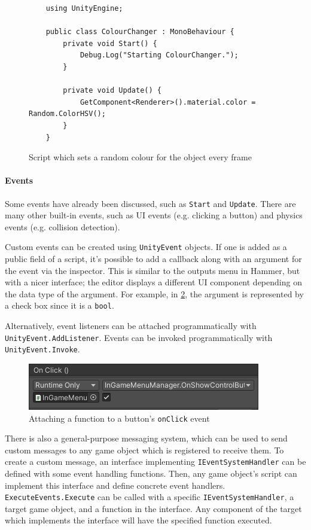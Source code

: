 \documentclass[a4paper, 12pt]{scrartcl}
\begin{document}
\begin{figure}[!htb]
  \begin{verbatim}
    using UnityEngine;

    public class ColourChanger : MonoBehaviour {
        private void Start() {
            Debug.Log("Starting ColourChanger.");
        }

        private void Update() {
            GetComponent<Renderer>().material.color = Random.ColorHSV();
        }
    }
  \end{verbatim}
  \caption{Script which sets a random colour for the object every frame}
  \label{fig:unity_script}
\end{figure}

\paragraph{Events}
Some events have already been discussed, such as \texttt{Start} and \texttt{Update}. There are many other built-in events, such as UI events (e.g. clicking a button) and physics events (e.g. collision detection).

Custom events can be created using \texttt{UnityEvent} objects. If one is added as a public field of a script, it's possible to add a callback along with an argument for the event via the inspector. This is similar to the outputs menu in Hammer, but with a nicer interface; the editor displays a different UI component depending on the data type of the argument. For example, in \cref{fig:unity_event_inspector}, the argument is represented by a check box since it is a \texttt{bool}.

Alternatively, event listeners can be attached programmatically with \texttt{UnityEvent\-.AddListener}. Events can be invoked programmatically with \texttt{UnityEvent.Invoke}.

\begin{figure}[!htb]
  \centering
  \includegraphics[scale=0.75]{images/unity_event_inspector.png}
  \caption{Attaching a function to a button's \texttt{onClick} event}
  \label{fig:unity_event_inspector}
\end{figure}

There is also a general-purpose messaging system, which can be used to send custom messages to any game object which is registered to receive them. To create a custom message, an interface implementing \texttt{IEventSystemHandler} can be defined with some event handling functions. Then, any game object's script can implement this interface and define concrete event handlers. \texttt{ExecuteEvents.Execute} can be called with a specific \texttt{IEventSystemHandler}, a target game object, and a function in the interface. Any component of the target which implements the interface will have the specified function executed.
\end{document}
